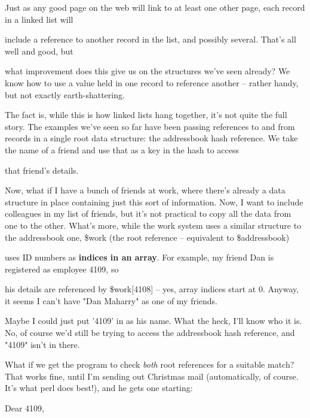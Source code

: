 \documentclass[a4paper,11pt]{book}
\begin{document}
\noindent Just as any good page on the web will link to at least one other page, each record in a linked list will

\noindent include a reference to another record in the list, and possibly several. That's all well and good, but

\noindent what improvement does this give us on the structures we've seen already? We know how to use a value held in one record to reference another -- rather handy, but not exactly earth-shattering.

\noindent 

\noindent The fact is, while this is how linked lists hang together, it's not quite the full story. The examples we've seen so far have been passing references to and from records in a single root data structure: the addressbook hash reference. We take the name of a friend and use that as a key in the hash to access

\noindent that friend's details.

\noindent 

\noindent Now, what if I have a bunch of friends at work, where there's already a data structure in place containing just this sort of information. Now, I want to include colleagues in my list of friends, but it's not practical to copy all the data from one to the other. What's more, while the work system uses a similar structure to the addressbook one, \$work (the root reference -- equivalent to \$addressbook)

\noindent uses ID numbers as \textbf{indices in an array}. For example, my friend Dan is registered as employee 4109, so

\noindent his details are referenced by \$work[4108] -- yes, array indices start at 0. Anyway, it seems I can't have "Dan Maharry" as one of my friends.

\noindent 

\noindent Maybe I could just put '4109' in as his name. What the heck, I'll know who it is. No, of course we'd still be trying to access the addressbook hash reference, and "4109" isn't in there.

\noindent 

\noindent What  if we get the program to  check  \textit{both  }root  references  for  a  suitable  match?  That  works  fine, until I'm sending out  Christmas  mail  (automatically,  of course. It's  what perl  does  best!),  and  he gets one starting:

\noindent 

\noindent Dear 4109,
\end{document}
